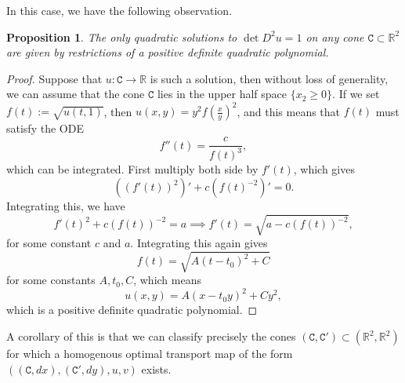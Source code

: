 \documentclass[12pt,reqno]{amsart}
\newtheorem{prop}{Proposition}[section]
\numberwithin{equation}{section}
\begin{document}
        
        In this case, we have the following observation. 
        \begin{prop}\label{prop: quadratic-poly}
            The only quadratic solutions to $\det D^2u =1$ on any cone $\mathtt C\subset \mathbb R^2$ are given by restrictions of a positive definite quadratic polynomial. 
        \end{prop}
        \begin{proof}
            Suppose that $u:\mathtt C\to \mathbb R$ is such a solution, then without loss of generality, we can assume that the cone $\mathtt C$ lies in the upper half space $\{x_2\geq 0\}$. If we set $f(t) := \sqrt{u(t, 1)}$, then $u(x, y) = y^2f(\frac{x}{y})^2$, and this means that $f(t)$ must satisfy the ODE
            \[f''(t) = \frac{c}{f(t)^3},\]
            which can be integrated. First multiply both side by $f'(t)$, which gives
            \[((f'(t))^2)' +c (f(t)^{-2})' = 0. \]
            Integrating this, we have
            \[f'(t)^2+c(f(t))^{-2} = a \implies f'(t) = \sqrt{a-c(f(t))^{-2}}, \]
            for some constant $c$ and $a$. Integrating this again gives
            \[f(t) = \sqrt{A(t-t_0)^2+C}\]
            for some constants $A, t_0, C$, which means 
            \[u(x, y) = A(x-t_0y)^2+Cy^2, \]
            which is a positive definite quadratic polynomial. 
        \end{proof}
        A corollary of this is that we can classify precisely the cones $(\mathtt C, \mathtt C')\subset (\mathbb R^2, \mathbb R^2)$ for which a homogenous optimal transport map of the form $((\mathtt C, dx), (\mathtt C', dy), u, v)$ exists. 
\end{document}
